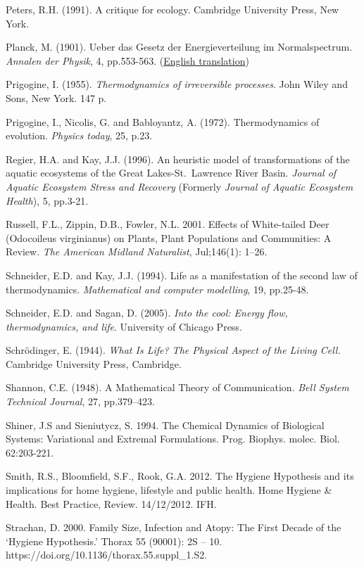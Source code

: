 \documentclass[11pt,letterpaper,]{paper}
\begin{document}
Peters, R.H. (1991). A critique for ecology. Cambridge University Press,
New York.

Planck, M. (1901). Ueber das Gesetz der Energieverteilung im
Normalspectrum. \emph{Annalen der Physik}, 4, pp.553-563.
(\href{https://web.archive.org/web/20081217042934/http://dbhs.wvusd.k12.ca.us/webdocs/Chem-History/Planck-1901/Planck-1901.html}{English
translation})

Prigogine, I. (1955). \emph{Thermodynamics of irreversible processes}.
John Wiley and Sons, New York. 147 p.~

Prigogine, I., Nicolis, G. and Babloyantz, A. (1972). Thermodynamics of
evolution. \emph{Physics today}, 25, p.23.

Regier, H.A. and Kay, J.J. (1996). An heuristic model of transformations
of the aquatic ecosystems of the Great Lakes-St.~Lawrence River Basin.
\emph{Journal of Aquatic Ecosystem Stress and Recovery} (Formerly
\emph{Journal of Aquatic Ecosystem Health}), 5, pp.3-21.

Russell, F.L., Zippin, D.B., Fowler, N.L. 2001. Effects of White-tailed
Deer (Odocoileus virginianus) on Plants, Plant Populations and
Communities: A Review. \emph{The American Midland Naturalist},
Jul;146(1): 1--26.

Schneider, E.D. and Kay, J.J. (1994). Life as a manifestation of the
second law of thermodynamics. \emph{Mathematical and computer
modelling}, 19, pp.25-48.

Schneider, E.D. and Sagan, D. (2005). \emph{Into the cool: Energy flow,
thermodynamics, and life}. University of Chicago Press.

Schrödinger, E. (1944). \emph{What Is Life? The Physical Aspect of the
Living Cell.} Cambridge University Press, Cambridge.

Shannon, C.E. (1948). A Mathematical Theory of Communication. \emph{Bell
System Technical Journal}, 27, pp.379--423.

Shiner, J.S and Sieniutycz, S. 1994. The Chemical Dynamics of Biological
Systems: Variational and Extremal Formulations. Prog. Biophys. molec.
Biol. 62:203-221.

Smith, R.S., Bloomfield, S.F., Rook, G.A. 2012. The Hygiene Hypothesis
and its implications for home hygiene, lifestyle and public health. Home
Hygiene \& Health. Best Practice, Review. 14/12/2012. IFH.

Strachan, D. 2000. Family Size, Infection and Atopy: The First Decade of
the `Hygiene Hypothesis.' Thorax 55 (90001): 2S -- 10.
https://doi.org/10.1136/thorax.55.suppl\_1.S2.
\end{document}
